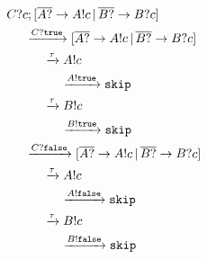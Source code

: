 \documentclass[compress]{beamer}
\begin{document}
\begin{frame}
    \small
    \begin{align*}
        & C?c; [\overline{A?} \rightarrow A!c \, | \, \overline{B?} \rightarrow B?c] \\
        & \hspace{0.5cm} \xrightarrow{C?\mathtt{true}} [\overline{A?} \rightarrow A!c \, | \, \overline{B?} \rightarrow B?c] \\
        & \hspace{1.0cm} \xrightarrow{\tau} A!c \\
        & \hspace{1.5cm} \xrightarrow{A!\mathtt{true}} \mathtt{skip} \\
        & \hspace{1.0cm} \xrightarrow{\tau} B!c \\
        & \hspace{1.5cm} \xrightarrow{B!\mathtt{true}} \mathtt{skip} \\
        & \hspace{0.5cm} \xrightarrow{C?\mathtt{false}} [\overline{A?} \rightarrow A!c \, | \, \overline{B?} \rightarrow B?c] \\
        & \hspace{1.0cm} \xrightarrow{\tau} A!c \\
        & \hspace{1.5cm} \xrightarrow{A!\mathtt{false}} \mathtt{skip} \\
        & \hspace{1.0cm} \xrightarrow{\tau} B!c \\
        & \hspace{1.5cm} \xrightarrow{B!\mathtt{false}} \mathtt{skip}
    \end{align*}
\end{frame}
\end{document}
